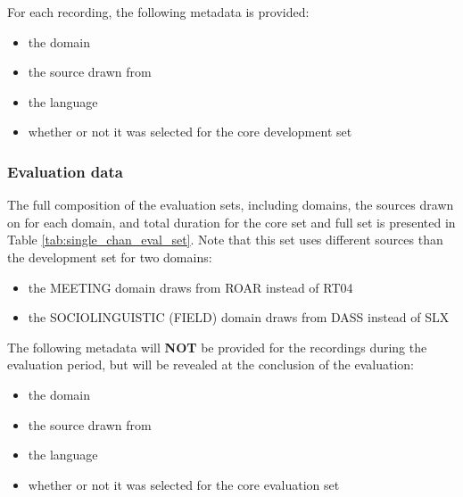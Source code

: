 \documentclass{article}
\begin{document}
For each recording, the following metadata is provided:
    \begin{itemize}
        \item the domain
        \item the source drawn from
        \item the language
        \item whether or not it was selected for the core development set
    \end{itemize}


\subsubsection{Evaluation data}
The full composition of the evaluation sets, including domains, the sources drawn on for each domain, and total duration for the core set and full set is presented in Table \ref{tab:single_chan_eval_set}. Note that this set uses different sources than the development set for two domains:
    \begin{itemize}
        \item the MEETING domain draws from ROAR instead of RT04
        \item the SOCIOLINGUISTIC (FIELD) domain draws from DASS instead of SLX
    \end{itemize}
The following metadata will {\bf NOT} be provided for the recordings during the evaluation period, but will be revealed at the conclusion of the evaluation:
    \begin{itemize}
        \item the domain
        \item the source drawn from
        \item the language
        \item whether or not it was selected for the core evaluation set
    \end{itemize}
\end{document}
